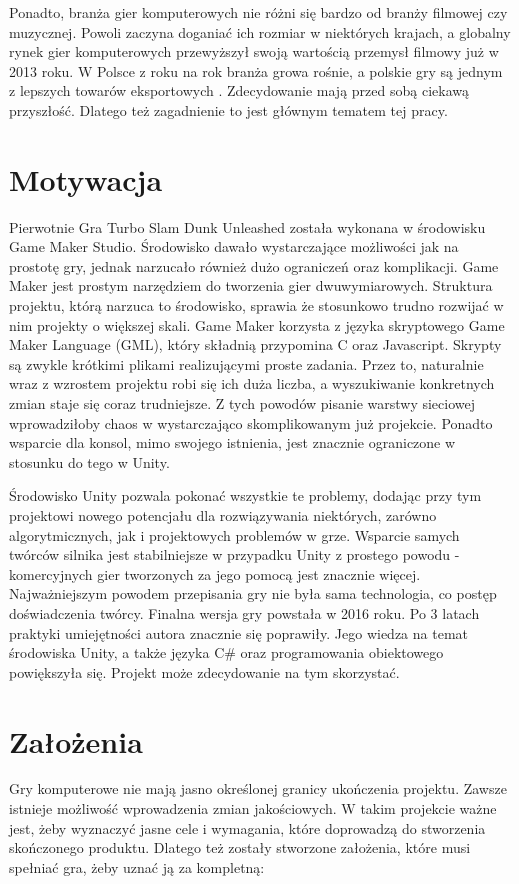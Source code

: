 \documentclass[a4paper,12pt,twoside,openany]{report}
\begin{document}
Ponadto, branża gier komputerowych nie różni się bardzo od branży filmowej czy muzycznej. Powoli zaczyna doganiać ich rozmiar w niektórych krajach, a globalny rynek gier komputerowych przewyższył swoją wartością przemysł filmowy już w 2013 roku. W Polsce z roku na rok branża growa rośnie, a polskie gry są jednym z lepszych towarów eksportowych \cite{canalplus_gry}. Zdecydowanie mają przed sobą ciekawą przyszłość. Dlatego też zagadnienie to jest głównym tematem tej pracy. 

\section{Motywacja}
Pierwotnie Gra Turbo Slam Dunk Unleashed została wykonana w środowisku Game Maker Studio. Środowisko dawało wystarczające możliwości jak na prostotę gry, jednak narzucało również dużo ograniczeń oraz komplikacji. Game Maker jest prostym narzędziem do tworzenia gier dwuwymiarowych. Struktura projektu, którą narzuca to środowisko, sprawia że stosunkowo trudno rozwijać w nim projekty o większej skali. Game Maker korzysta z języka skryptowego Game Maker Language (GML), który składnią przypomina C oraz Javascript. Skrypty są zwykle krótkimi plikami realizującymi proste zadania. Przez to, naturalnie wraz z wzrostem projektu robi się ich duża liczba, a wyszukiwanie konkretnych zmian staje się coraz trudniejsze. Z tych powodów pisanie warstwy sieciowej wprowadziłoby chaos w wystarczająco skomplikowanym już projekcie.  Ponadto wsparcie dla konsol, mimo swojego istnienia, jest znacznie ograniczone w stosunku do tego w Unity.

Środowisko Unity pozwala pokonać wszystkie te problemy, dodając przy tym projektowi nowego potencjału dla rozwiązywania niektórych, zarówno algorytmicznych, jak i projektowych problemów w grze. Wsparcie samych twórców silnika jest stabilniejsze w przypadku Unity z prostego powodu - komercyjnych gier tworzonych za jego pomocą jest znacznie więcej. Najważniejszym powodem przepisania gry nie była sama technologia, co postęp doświadczenia twórcy. Finalna wersja gry powstała w 2016 roku. Po 3 latach praktyki umiejętności autora znacznie się poprawiły. Jego wiedza na temat środowiska Unity, a także języka C\# oraz programowania obiektowego powiększyła się. Projekt może zdecydowanie na tym skorzystać. 

\section{Założenia}
Gry komputerowe nie mają jasno określonej granicy ukończenia projektu. Zawsze istnieje możliwość wprowadzenia zmian jakościowych. W takim projekcie ważne jest, żeby wyznaczyć jasne cele i wymagania, które doprowadzą do stworzenia skończonego produktu. Dlatego też zostały stworzone założenia, które musi spełniać gra, żeby uznać ją za kompletną:
\end{document}
